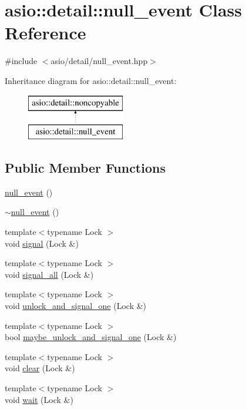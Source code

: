 \hypertarget{classasio_1_1detail_1_1null__event}{}\section{asio\+:\+:detail\+:\+:null\+\_\+event Class Reference}
\label{classasio_1_1detail_1_1null__event}


{\ttfamily \#include $<$asio/detail/null\+\_\+event.\+hpp$>$}

Inheritance diagram for asio\+:\+:detail\+:\+:null\+\_\+event\+:\begin{figure}[H]
\begin{center}
\leavevmode
\includegraphics[height=2.000000cm]{classasio_1_1detail_1_1null__event}
\end{center}
\end{figure}
\subsection*{Public Member Functions}
\begin{DoxyCompactItemize}
\item 
\hyperlink{classasio_1_1detail_1_1null__event_a0c8c322d28fbb58e6041e5706bd17bdc}{null\+\_\+event} ()
\item 
\hyperlink{classasio_1_1detail_1_1null__event_ac9420a0ec1e2cc7270e305fd9d38d994}{$\sim$null\+\_\+event} ()
\item 
{\footnotesize template$<$typename Lock $>$ }\\void \hyperlink{classasio_1_1detail_1_1null__event_a07a2356e5199e7e54b333b7270f4cc35}{signal} (Lock \&)
\item 
{\footnotesize template$<$typename Lock $>$ }\\void \hyperlink{classasio_1_1detail_1_1null__event_a0022cc640d1a1b97ce8ca4c3de362e3a}{signal\+\_\+all} (Lock \&)
\item 
{\footnotesize template$<$typename Lock $>$ }\\void \hyperlink{classasio_1_1detail_1_1null__event_af76813b0a7fbae930412dcdc08070173}{unlock\+\_\+and\+\_\+signal\+\_\+one} (Lock \&)
\item 
{\footnotesize template$<$typename Lock $>$ }\\bool \hyperlink{classasio_1_1detail_1_1null__event_a9dc079f6ba2be2c32acbb33996162199}{maybe\+\_\+unlock\+\_\+and\+\_\+signal\+\_\+one} (Lock \&)
\item 
{\footnotesize template$<$typename Lock $>$ }\\void \hyperlink{classasio_1_1detail_1_1null__event_a6ad86da934e32d8856398cbc52efdfed}{clear} (Lock \&)
\item 
{\footnotesize template$<$typename Lock $>$ }\\void \hyperlink{classasio_1_1detail_1_1null__event_a1283b11b26d09def9d828760903ed74f}{wait} (Lock \&)
\end{DoxyCompactItemize}


